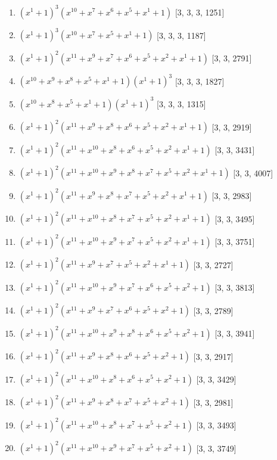 \documentclass[10pt,twocolumn]{article}
\begin{document}
\begin{enumerate}
\item $(x^{1} + 1)^{3}(x^{10} + x^{7} + x^{6} + x^{5} + x^{1} + 1)$  [3, 3, 3, 1251]
\item $(x^{1} + 1)^{3}(x^{10} + x^{7} + x^{5} + x^{1} + 1)$  [3, 3, 3, 1187]
\item $(x^{1} + 1)^{2}(x^{11} + x^{9} + x^{7} + x^{6} + x^{5} + x^{2} + x^{1} + 1)$  [3, 3, 2791]
\item $(x^{10} + x^{9} + x^{8} + x^{5} + x^{1} + 1)(x^{1} + 1)^{3}$  [3, 3, 3, 1827]
\item $(x^{10} + x^{8} + x^{5} + x^{1} + 1)(x^{1} + 1)^{3}$  [3, 3, 3, 1315]
\item $(x^{1} + 1)^{2}(x^{11} + x^{9} + x^{8} + x^{6} + x^{5} + x^{2} + x^{1} + 1)$  [3, 3, 2919]
\item $(x^{1} + 1)^{2}(x^{11} + x^{10} + x^{8} + x^{6} + x^{5} + x^{2} + x^{1} + 1)$  [3, 3, 3431]
\item $(x^{1} + 1)^{2}(x^{11} + x^{10} + x^{9} + x^{8} + x^{7} + x^{5} + x^{2} + x^{1} + 1)$  [3, 3, 4007]
\item $(x^{1} + 1)^{2}(x^{11} + x^{9} + x^{8} + x^{7} + x^{5} + x^{2} + x^{1} + 1)$  [3, 3, 2983]
\item $(x^{1} + 1)^{2}(x^{11} + x^{10} + x^{8} + x^{7} + x^{5} + x^{2} + x^{1} + 1)$  [3, 3, 3495]
\item $(x^{1} + 1)^{2}(x^{11} + x^{10} + x^{9} + x^{7} + x^{5} + x^{2} + x^{1} + 1)$  [3, 3, 3751]
\item $(x^{1} + 1)^{2}(x^{11} + x^{9} + x^{7} + x^{5} + x^{2} + x^{1} + 1)$  [3, 3, 2727]
\item $(x^{1} + 1)^{2}(x^{11} + x^{10} + x^{9} + x^{7} + x^{6} + x^{5} + x^{2} + 1)$  [3, 3, 3813]
\item $(x^{1} + 1)^{2}(x^{11} + x^{9} + x^{7} + x^{6} + x^{5} + x^{2} + 1)$  [3, 3, 2789]
\item $(x^{1} + 1)^{2}(x^{11} + x^{10} + x^{9} + x^{8} + x^{6} + x^{5} + x^{2} + 1)$  [3, 3, 3941]
\item $(x^{1} + 1)^{2}(x^{11} + x^{9} + x^{8} + x^{6} + x^{5} + x^{2} + 1)$  [3, 3, 2917]
\item $(x^{1} + 1)^{2}(x^{11} + x^{10} + x^{8} + x^{6} + x^{5} + x^{2} + 1)$  [3, 3, 3429]
\item $(x^{1} + 1)^{2}(x^{11} + x^{9} + x^{8} + x^{7} + x^{5} + x^{2} + 1)$  [3, 3, 2981]
\item $(x^{1} + 1)^{2}(x^{11} + x^{10} + x^{8} + x^{7} + x^{5} + x^{2} + 1)$  [3, 3, 3493]
\item $(x^{1} + 1)^{2}(x^{11} + x^{10} + x^{9} + x^{7} + x^{5} + x^{2} + 1)$  [3, 3, 3749]

\end{enumerate}
\end{document}
